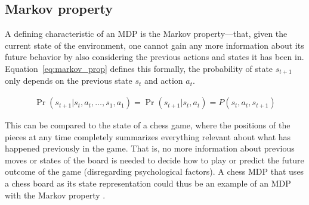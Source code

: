 \subsection{Markov property}

A defining characteristic of an MDP is the Markov property---that, given the
current state of the environment, one cannot gain any more information about
its future behavior by also considering the previous actions and states it has
been in. Equation~\eqref{eq:markov_prop} defines this formally, the probability
of state $s_{t+1}$ only depends on the previous state $s_t$ and action $a_t$.

\begin{align}
\label{eq:markov_prop}
\Pr(s_{t+1} | s_t, a_t, \ldots, s_1, a_1) 
  = \Pr(s_{t+1} | s_t, a_t) 
  = P(s_t, a_t, s_{t+1})
\end{align}

This can be compared to the state of a chess game, where the positions
of the pieces at any time completely summarizes everything relevant about what
has happened previously in the game. That is, no more information about
previous moves or states of the board is needed to decide how to play or
predict the future outcome of the game (disregarding psychological factors). A
chess MDP that uses a chess board as its state representation could thus be an
example of an MDP with the Markov property \parencite{altman2002applications}. 

